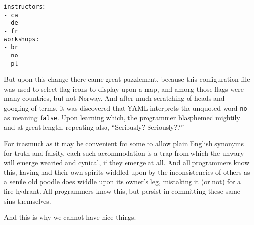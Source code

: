 \begin{lstlisting}
instructors:
- ca
- de
- fr
workshops:
- br
- no
- pl
\end{lstlisting}

But upon this change there came great puzzlement,
because this configuration file was used to select flag icons to display upon a map,
and among those flags were many countries, but not Norway.
And after much scratching of heads and googling of terms,
it was discovered that YAML interprets the unquoted word \texttt{no} as meaning \texttt{false}.
Upon learning which,
the programmer blasphemed mightily and at great length,
repeating also,
``Seriously?  Seriously??''

For inasmuch as it may be convenient for some to allow plain English synonyms for truth and falsity,
each such accommodation is a trap from which the unwary will emerge wearied and cynical,
if they emerge at all.
And all programmers know this,
having had their own spirits widdled upon by the inconsistencies of others
as a senile old poodle does widdle upon its owner's leg,
mistaking it (or not) for a fire hydrant.
All programmers know this,
but persist in committing these same sins themselves.

And this is why we cannot have nice things.
